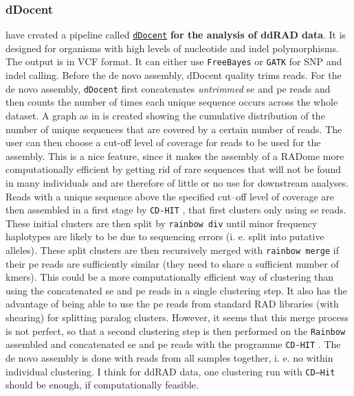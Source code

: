 \documentclass{article}\usepackage[]{graphicx}\usepackage[]{color}
\begin{document}
\subsubsection{dDocent}

\cite{Puritz2014a} have created a pipeline called \href{https://ddocent.wordpress.com/ddocent-pipeline-user-guide/}{\texttt{dDocent}} \textbf{for the analysis of ddRAD data}. It is designed for organisms with high levels of nucleotide and \gls{indel} polymorphisms. The output is in VCF format. It can either use \texttt{FreeBayes} or \texttt{GATK} for SNP and \gls{indel} calling. Before the de novo assembly, dDocent quality trims reads. For the de novo assembly, \texttt{dDocent} first concatenates \emph{untrimmed} \gls{se} and \gls{pe} reads and then counts the number of times each unique sequence occurs across the whole dataset. A graph as in \citealt[fig. 1]{Puritz2014a} is created showing the cumulative distribution of the number of unique sequences that are covered by a certain number of reads. The user can then choose a cut-off level of coverage for reads to be used for the assembly. This is a nice feature, since it makes the assembly of a RADome more computationally efficient by getting rid of rare sequences that will not be found in many individuals and are therefore of little or no use for downstream analyses.  Reads with a unique sequence above the specified cut--off level of coverage are then assembled in a first stage by \texttt{CD-HIT} \citep{Fu2012}, that first clusters only using \gls{se} reads. These initial clusters are then split by \texttt{rainbow div} \citep{Chong2012} until minor frequency haplotypes are likely to be due to sequencing errors (i. e. split into putative alleles). These split clusters are then recursively merged with \texttt{rainbow merge} if their \gls{pe} reads are sufficiently similar (they need to share a sufficient number of kmers). This could be a more computationally efficient way of clustering than using the concatenated \gls{se} and \gls{pe} reads in a single clustering step. It also has the advantage of being able to use the \gls{pe} reads from standard RAD libraries (with shearing) for splitting paralog clusters. However, it seems that this merge process is not perfect, so that a second clustering step is then performed on the \texttt{Rainbow} assembled and concatenated \gls{se} and \gls{pe} reads with the programme \texttt{CD-HIT} \citep{Fu2012}. The de novo assembly is done with reads from all samples together, i. e. no within individual clustering. I think for ddRAD data, one clustering run with \texttt{CD--Hit} should be enough, if computationally feasible.
\end{document}
